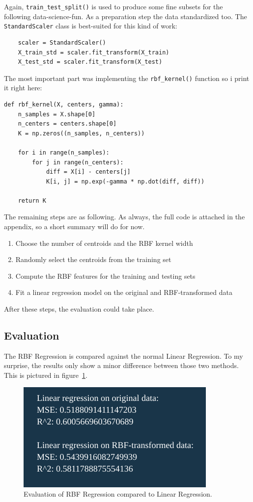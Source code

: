 \documentclass{CPSReport}
\begin{document}
Again, \texttt{train_test_split()} is used to produce some fine subsets for the following data-science-fun. As a preparation step the data standardized too. The \texttt{StandardScaler} class is best-suited for this kind of work:
\begin{verbatim}
    scaler = StandardScaler()
    X_train_std = scaler.fit_transform(X_train)
    X_test_std = scaler.fit_transform(X_test)
\end{verbatim}

The most important part was implementing the \texttt{rbf_kernel()} function so i print it right here:
\begin{verbatim}
def rbf_kernel(X, centers, gamma):
    n_samples = X.shape[0]
    n_centers = centers.shape[0]
    K = np.zeros((n_samples, n_centers))

    for i in range(n_samples):
        for j in range(n_centers):
            diff = X[i] - centers[j]
            K[i, j] = np.exp(-gamma * np.dot(diff, diff))

    return K
\end{verbatim}

The remaining steps are as following. As always, the full code is attached in the appendix, so a short summary will do for now.
\begin{enumerate}
    \item Choose the number of centroids and the RBF kernel width
    \item Randomly select the centroids from the training set
    \item Compute the RBF features for the training and testing sets
    \item Fit a linear regression model on the original and RBF-transformed data
\end{enumerate}
After these steps, the evaluation could take place.

\subsection{Evaluation}
The RBF Regression is compared against the normal Linear Regression. To my surprise, the results only show a minor difference between those two methods. This is pictured in figure~\ref{fig:RBF_eval}. 
\begin{figure}[ht]
    \centering
    \includegraphics[width=0.9\linewidth]{pics/RBF_eval.png}
    \caption{Evaluation of RBF Regression compared to Linear Regression.}
    \label{fig:RBF_eval}
\end{figure}
\clearpage
\end{document}
